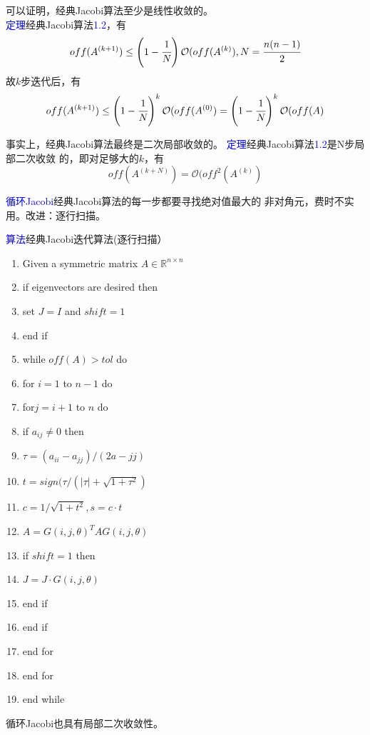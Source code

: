 \documentclass[notheorems,serif]{beamer}
\begin{document}
\begin{frame}

可以证明，经典Jacobi算法至少是线性收敛的。\\
\textcolor{blue}{定理}\quad 经典Jacobi算法\textcolor{blue}{1.2}，有$$off(A^{(k+1)}) \le \left(1-\cfrac{1}{N} \right)\mathcal O(off(A^{(k)}),N=\cfrac{n(n-1)}{2}$$
故$k$步迭代后，有$$off(A^{(k+1)}) \le \left(1-\cfrac{1}{N} \right)^k \mathcal O(off(A^{(0)})=\left(1-\cfrac{1}{N} \right)^k \mathcal O(off(A)$$
\end{frame}
\begin{frame}

事实上，经典Jacobi算法最终是二次局部收敛的。
\textcolor{blue}{定理}\quad 经典Jacobi算法\textcolor{blue}{1.2}是N步局部二次收敛
的，即对足够大的$k$，有$$off(A^{(k+N)})=\mathcal O(off^2(A^{(k)})$$

\textcolor{blue}{循环Jacobi}\quad 经典Jacobi算法的每一步都要寻找绝对值最大的
非对角元，费时不实用。改进：逐行扫描。\\
\end{frame}
\begin{frame}

\textcolor{blue}{算法}\quad 经典Jacobi迭代算法(逐行扫描）
\begin{enumerate}[1:]
	\item Given a symmetric matrix $A\in \mathbb R^{n\times n}$
	\item if eigenvectors are desired then
	\item \quad set $J=I$ and $shift=1$
	\item end if
	\item while $off(A)>tol$ do
	\item \quad for $i=1$ to $n-1$ do
	\item \qquad for$j=i+1$ to $n$ do
	\item \qquad \quad if $a_{ij}\neq 0$ then
	\item \qquad \qquad $\tau=(a_{ii}-a_{jj})/(2a-{jj})$
	\item \qquad \qquad $t=sign(\tau/(|\tau|+\sqrt{1+\tau ^2})$
	\item \qquad \qquad $c=1/\sqrt{1+t^2},s=c\cdot t$
	\item \qquad \qquad $A=G(i,j,\theta)^TAG(i,j,\theta)$
	\item \qquad \qquad if $shift=1$ then
	\item \qquad \qquad \quad$J=J\cdot G(i,j,\theta)$
	\item \qquad \qquad end if
	\item \qquad \quad end if
	\item \qquad end for
	\item \quad end for
	\item end while
\end{enumerate}

循环Jacobi也具有局部二次收敛性。
\end{frame}
\end{document}
